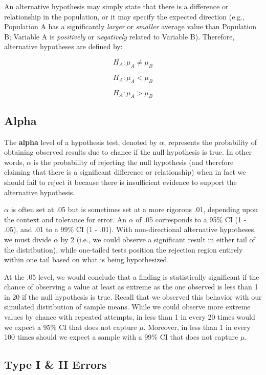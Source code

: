 \documentclass[
]{book}
\begin{document}
An alternative hypothesis may simply state that there is a difference or relationship in the population, or it may specify the expected direction (e.g., Population A has a significantly \emph{larger} or \emph{smaller} average value than Population B; Variable A is \emph{positively} or \emph{negatively} related to Variable B). Therefore, alternative hypotheses are defined by:

\[ H_A: \mu_A \neq \mu_B \]

\[ H_A: \mu_A < \mu_B \]

\[ H_A: \mu_A > \mu_B \]

\hypertarget{alpha}{%
\subsection{Alpha}\label{alpha}}

The \textbf{alpha} level of a hypothesis test, denoted by \(\alpha\), represents the probability of obtaining observed results due to chance if the null hypothesis is true. In other words, \(\alpha\) is the probability of rejecting the null hypothesis (and therefore claiming that there is a significant difference or relationship) when in fact we should fail to reject it because there is insufficient evidence to support the alternative hypothesis.

\(\alpha\) is often set at .05 but is sometimes set at a more rigorous .01, depending upon the context and tolerance for error. An \(\alpha\) of .05 corresponds to a 95\% CI (1 - .05), and .01 to a 99\% CI (1 - .01). With non-directional alternative hypotheses, we must divide \(\alpha\) by 2 (i.e., we could observe a significant result in either tail of the distribution), while one-tailed tests position the rejection region entirely within one tail based on what is being hypothesized.

At the .05 level, we would conclude that a finding is statistically significant if the chance of observing a value at least as extreme as the one observed is less than 1 in 20 if the null hypothesis is true. Recall that we observed this behavior with our simulated distribution of sample means. While we could observe more extreme values by chance with repeated attempts, in less than 1 in every 20 times would we expect a 95\% CI that does not capture \(\mu\). Moreover, in less than 1 in every 100 times should we expect a sample with a 99\% CI that does not capture \(\mu\).

\hypertarget{type-i-ii-errors}{%
\subsection{Type I \& II Errors}\label{type-i-ii-errors}}
\end{document}
